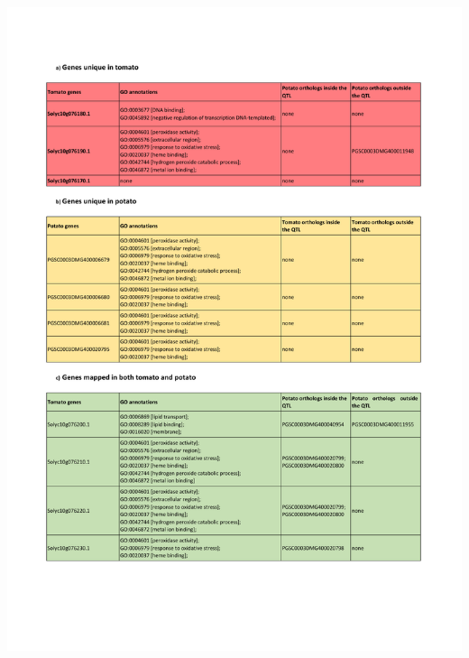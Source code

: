 \documentclass[applsci,article,accept,moreauthors,pdftex]{Definitions/mdpi}
\begin{document}
{\begin{table}[H]
\centering
\caption{\textbf{\hl{Table comparing genes} %
 in QTLs associated with (tomato) fruit shape and (potato) tuber shape.} Three classes represent (a) Genes unique in tomato;  (b) Genes unique in potato (c) Genes mapped in both species. Each row contains a geneID, GO annotations, orthologs inside QTL region, and~orthologs outside the QTL regions. The~query shows that only three genes are unique in tomato (i.e., \textit{Solyc10g076190.1}, \textit{Solyc10g076170.1}, \textit{Solyc10g076180.1}).
}
\includegraphics[scale=.88]{Table1.pdf}
\label{chap4:T1}
\end{table}

}
\end{document}
